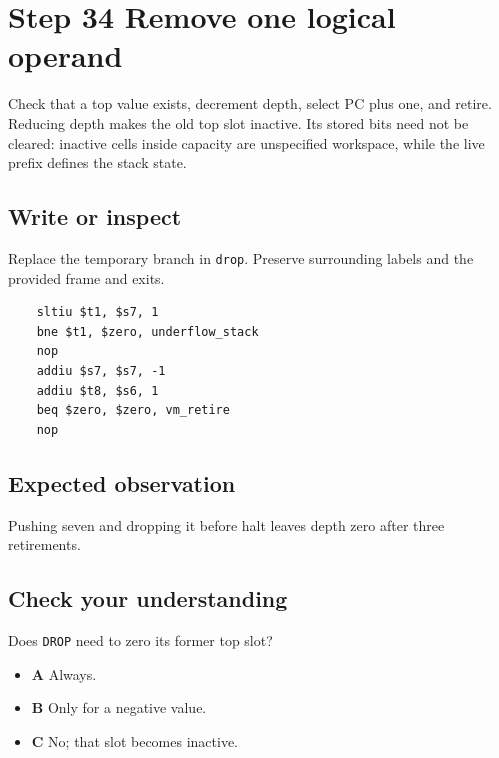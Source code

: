 \section{Step 34 Remove one logical operand}\label{vm-s34}

Check that a top value exists, decrement depth, select PC plus one, and retire. Reducing depth makes the old top slot inactive. Its stored bits need not be cleared: inactive cells inside capacity are unspecified workspace, while the live prefix defines the stack state.

\subsection{Write or inspect}
Replace the temporary branch in \texttt{drop}. Preserve surrounding labels and the provided frame and exits.

\begin{verbatim}
    sltiu $t1, $s7, 1
    bne $t1, $zero, underflow_stack
    nop
    addiu $s7, $s7, -1
    addiu $t8, $s6, 1
    beq $zero, $zero, vm_retire
    nop
\end{verbatim}
\subsection{Expected observation}
Pushing seven and dropping it before halt leaves depth zero after three retirements.

\subsection{Check your understanding}
Does \texttt{DROP} need to zero its former top slot?

\begin{itemize}
  \item \textbf{A} Always.
  \item \textbf{B} Only for a negative value.
  \item \textbf{C} No; that slot becomes inactive.
\end{itemize}
